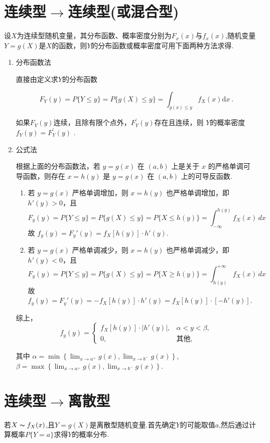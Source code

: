 \section{连续型$\rightarrow$连续型(或混合型)}
设$X$为连续型随机变量，其分布函数、概率密度分别为$F_x(x)$与$f_x(x)$,随机变量$Y=g(X)$是$X$的函数，则$Y$的分布函数或概率密度可用下面两种方法求得.
\begin{enumerate}
    \item 分布函数法

          直接由定义求$Y$的分布函数

          $$F_{Y}(y)=P\{Y\leqslant y\}=P\{g(X)\leqslant y\}=\int_{g(x)\leqslant y}f_{X}(x)\mathrm{d}x\:.$$

          如果$F_Y(y)$连续，且除有限个点外，$F_Y^\prime(y)$存在且连续，则 $Y$的概率密度$f_Y(y)=F_Y^\prime(y)$ .
    \item 公式法 \DTwoThree

          根据上面的分布函数法，若 $y = g(x)$ 在 $(a, b)$ 上是关于 $x$ 的严格单调可导函数，则存在 $x = h(y)$ 是 $y = g(x)$ 在 $(a, b)$ 上的可导反函数.
          \begin{enumerate}
              \item 若 $y = g(x)$ 严格单调增加，则 $x = h(y)$ 也严格单调增加，即 $h'(y) > 0$，且
                    $$F_y(y) = P\{Y \leqslant y\} = P\{g(X) \leqslant y\} = P\{X \leqslant h(y)\} = \int_{-\infty}^{h(y)} f_X(x) \, dx$$
                    故 $f_y(y) = F_y'(y) = f_X[h(y)] \cdot h'(y)$.
              \item 若 $y = g(x)$ 严格单调减少，则 $x = h(y)$ 也严格单调减少，即 $h'(y) < 0$，且
                    $$
                        F_y(y) = P\{Y \leqslant y\} = P\{g(X) \leqslant y\} = P\{X \geqslant h(y)\} = \int_{h(y)}^{+\infty} f_X(x) \, dx$$
                    故 $f_y(y) = F_y'(y) = -f_X[h(y)] \cdot h'(y) = f_X[h(y)] \cdot [-h'(y)]$.
          \end{enumerate}

          综上，
          $$f_y(y) = \begin{cases} f_X[h(y)] \cdot |h'(y)|, & \alpha < y < \beta, \\ 0, & \text{其他,} \end{cases}$$

          其中 $\alpha = \min \left\{ \lim_{x \to a^+} g(x), \lim_{x \to b^-} g(x) \right\}$, $\beta = \max \left\{ \lim_{x \to a^+} g(x), \lim_{x \to b^-} g(x) \right\}$.

\end{enumerate}
\section{连续型$\rightarrow$离散型}
若$X\thicksim f_X(x)$,且$Y=g(X)$是离散型随机变量.首先确定$Y$的可能取值$a$,然后通过计算概率$P\{Y=a\}$求得$Y$的概率分布.

